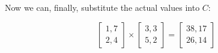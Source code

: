 Now we can, finally, substitute the actual values into $C$:

\begin{equation*}
    \begin{bmatrix}
        1, 7\\
        2, 4
    \end{bmatrix}
    \times
    \begin{bmatrix}
        3, 3\\
        5, 2
    \end{bmatrix}
    =
    \begin{bmatrix}
        38, 17\\
        26, 14
    \end{bmatrix}
\end{equation*}